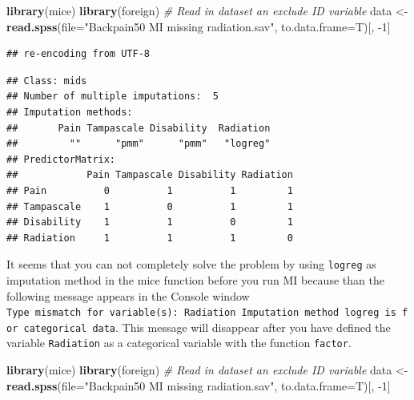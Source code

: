 \documentclass[
]{book}
\newenvironment{Shaded}{\begin{snugshade}}{\end{snugshade}}
\newcommand{\CommentTok}[1]{\textcolor[rgb]{0.56,0.35,0.01}{\textit{#1}}}
\newcommand{\DataTypeTok}[1]{\textcolor[rgb]{0.13,0.29,0.53}{#1}}
\newcommand{\DecValTok}[1]{\textcolor[rgb]{0.00,0.00,0.81}{#1}}
\newcommand{\KeywordTok}[1]{\textcolor[rgb]{0.13,0.29,0.53}{\textbf{#1}}}
\newcommand{\NormalTok}[1]{#1}
\newcommand{\OperatorTok}[1]{\textcolor[rgb]{0.81,0.36,0.00}{\textbf{#1}}}
\newcommand{\OtherTok}[1]{\textcolor[rgb]{0.56,0.35,0.01}{#1}}
\newcommand{\StringTok}[1]{\textcolor[rgb]{0.31,0.60,0.02}{#1}}
\begin{document}
\begin{Shaded}
\begin{Highlighting}[]
\KeywordTok{library}\NormalTok{(mice)}
\KeywordTok{library}\NormalTok{(foreign)}
\CommentTok{# Read in dataset an exclude ID variable}
\NormalTok{data <-}\StringTok{ }\KeywordTok{read.spss}\NormalTok{(}\DataTypeTok{file=}\StringTok{"Backpain50 MI missing radiation.sav"}\NormalTok{, }\DataTypeTok{to.data.frame=}\NormalTok{T)[, }\DecValTok{-1}\NormalTok{] }
\end{Highlighting}
\end{Shaded}

\begin{verbatim}
## re-encoding from UTF-8
\end{verbatim}

\begin{Shaded}
\end{Shaded}

\begin{verbatim}
## Class: mids
## Number of multiple imputations:  5 
## Imputation methods:
##       Pain Tampascale Disability  Radiation 
##         ""      "pmm"      "pmm"   "logreg" 
## PredictorMatrix:
##            Pain Tampascale Disability Radiation
## Pain          0          1          1         1
## Tampascale    1          0          1         1
## Disability    1          1          0         1
## Radiation     1          1          1         0
\end{verbatim}

It seems that you can not completely solve the problem by using
\texttt{logreg} as imputation method in the mice function before you run
MI because than the following message appears in the Console window
\texttt{Type\ mismatch\ for\ variable(s):\ Radiation\ Imputation\ method\ logreg\ is\ for\ categorical\ data}.
This message will disappear after you have defined the variable
\texttt{Radiation} as a categorical variable with the function
\texttt{factor}.

\begin{Shaded}
\begin{Highlighting}[]
\KeywordTok{library}\NormalTok{(mice)}
\KeywordTok{library}\NormalTok{(foreign)}
\CommentTok{# Read in dataset an exclude ID variable}
\NormalTok{data <-}\StringTok{ }\KeywordTok{read.spss}\NormalTok{(}\DataTypeTok{file=}\StringTok{"Backpain50 MI missing radiation.sav"}\NormalTok{, }\DataTypeTok{to.data.frame=}\NormalTok{T)[, }\DecValTok{-1}\NormalTok{] }
\end{Highlighting}
\end{Shaded}
\end{document}
